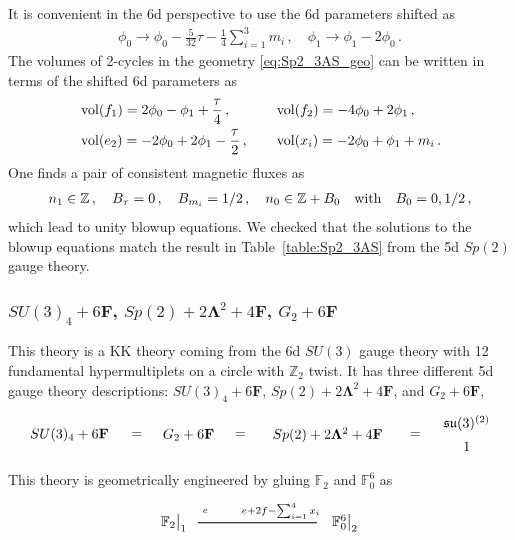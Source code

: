 It is convenient in the 6d perspective to use the 6d parameters shifted as
\begin{align}
\phi_0 \to \phi_0 - \frac{5}{32}\tau - \frac{1}{4}\sum_{i=1}^3 m_i\, , \quad
\phi_1 \to \phi_1 - 2\phi_0 \, .
\end{align}
The volumes of 2-cycles in the geometry \eqref{eq:Sp2_3AS_geo} can be written in terms of the shifted 6d parameters as
\begin{align}
&\operatorname{vol} (f_1) = 2\phi_0 - \phi_1 + \frac{\tau}{4}\,, \quad
&&\operatorname{vol} (f_2) = -4\phi_0 + 2\phi_1\,, \nonumber \\
&\operatorname{vol} (e_2) = -2\phi_0 + 2\phi_1 - \frac{\tau}{2}\,, \quad
&&\operatorname{vol} (x_i) = -2\phi_0 + \phi_1 + m_i \, .
\end{align}
One finds a pair of consistent magnetic fluxes as
\begin{align}
	n_1 \in \mathbb{Z} \, , \quad B_\tau = 0 \,, \quad B_{m_i}=1/2 \,, \quad n_0\in \mathbb{Z}+B_{0} \quad {\rm with} \quad B_0 = 0,1/2  \, ,
\end{align}
which lead to unity blowup equations. We checked that the solutions to the blowup equations match the result in Table~\ref{table:Sp2_3AS} from the 5d $Sp(2)$ gauge theory.


\subsubsection{\texorpdfstring{$SU(3)_4+6\mathbf{F}$, $Sp(2)+2\mathbf{\Lambda}^2+4\mathbf{F}$, $G_2+6\mathbf{F}$}{SU(3)4 + 6F}}

This theory is a KK theory coming from the 6d $ SU(3)$ gauge theory with 12 fundamental hypermultiplets on a circle with $ \mathbb{Z}_2 $ twist. It has three different 5d gauge theory descriptions: $ SU(3)_4 + 6\mathbf{F} $, $ Sp(2) + 2\mathbf{\Lambda}^2 + 4\mathbf{F} $, and  $G_2+6\mathbf{F}$,
\begin{align}
\begin{tikzpicture}
\draw (0, 0) node {$ SU(3)_4 + 6\mathbf{F} $}
(1.7, 0) node {$ = $}
(3, 0) node {$ G_2 + 6\mathbf{F} $}
(4.3, 0) node {$ = $}
(6.5, 0) node {$ Sp(2) + 2\mathbf{\Lambda}^2 + 4\mathbf{F} $}
(8.7, 0) node {$ = $}
(10, 0.3) node {$ \mathfrak{su}(3)^{(2)} $}
(10, -0.3) node {$ 1 $};
\end{tikzpicture}
\end{align}
This theory is geometrically engineered by gluing $ \mathbb{F}_2 $ and $ \mathbb{F}_0^6 $ as \cite{Jefferson:2018irk}
\begin{align}
\begin{tikzpicture}
\draw[thick](-3,0)--(0,0);	
\node at(-3.6,0) {$\mathbb{F}_{2}{}\big|_1$};
\node at(-2.8,0.3) {${}_e$};
\node at(0.7,0) {$\mathbb{F}_{0}^{6}{}\big|_2$};
\node at(-0.9,0.3) {${}_{e + 2f - \sum_{i=1}^4 x_i}$};
\end{tikzpicture}
\end{align}

